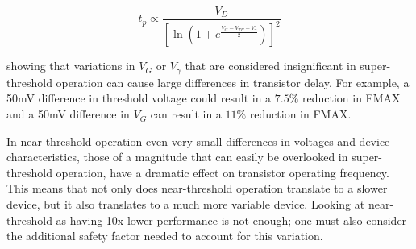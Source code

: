 \begin{equation}
\label{eqn:nth_delay}
t_p\propto\frac{V_D}{\left[\ln\left(1+e^\frac{V_G-V_{TH}-V_\gamma}{2}\right)\right]^2}
\end{equation}
 
 showing that variations in $V_G$ or $V_\gamma$ that are considered insignificant in super-threshold operation can cause large differences in transistor delay.
For example, a 50mV difference in threshold voltage could result in a $7.5\%$ reduction in FMAX and a 50mV difference in $V_G$ can result in a $11\%$ reduction in FMAX. 

In near-threshold operation even very small differences in voltages and device characteristics, those of a magnitude that can easily be overlooked in super-threshold operation, have a dramatic effect on transistor operating frequency. 
This means that not only does near-threshold operation translate to a slower device, but it also translates to a much more variable device.
Looking at near-threshold as having 10x lower performance is not enough; one must also consider the additional safety factor needed to account for this variation.